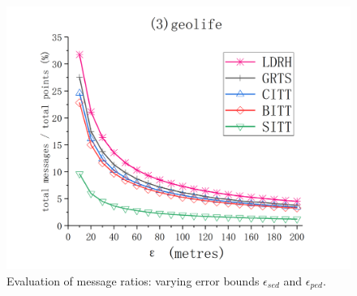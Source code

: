 {\begin{figure}[tb!]
	\includegraphics[scale = 0.555]{figures/Fig-geolife-total-messages.png}\hspace{0ex}
	\vspace{-2ex}
	\caption{\small Evaluation of message ratios: varying error bounds $\epsilon_{sed}$ and $\epsilon_{ped}$.}
	\label{fig:total-message}
	\vspace{-2ex}
\end{figure}

}
